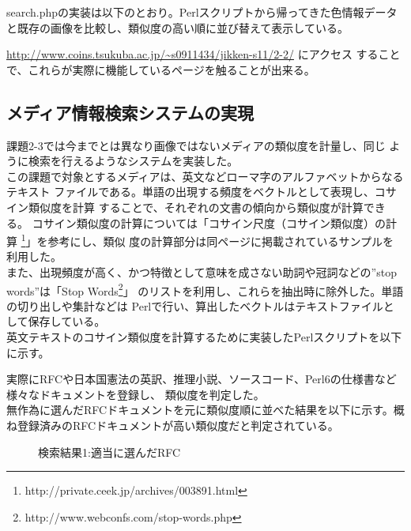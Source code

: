 \documentclass[a4paper,9pt]{jsarticle}
\begin{document}
search.phpの実装は以下のとおり。Perlスクリプトから帰ってきた色情報データ
と既存の画像を比較し、類似度の高い順に並び替えて表示している。



\url{http://www.coins.tsukuba.ac.jp/~s0911434/jikken-s11/2-2/} にアクセス
することで、これらが実際に機能しているページを触ることが出来る。

\subsection{メディア情報検索システムの実現}
課題2-3では今までとは異なり画像ではないメディアの類似度を計量し、同じ
ように検索を行えるようなシステムを実装した。\\

この課題で対象とするメディアは、英文などローマ字のアルファベットからなるテキスト
ファイルである。単語の出現する頻度をベクトルとして表現し、コサイン類似度を計算
することで、それぞれの文書の傾向から類似度が計算できる。
コサイン類似度の計算については「コサイン尺度（コサイン類似度）の計算
\footnote{http://private.ceek.jp/archives/003891.html}」を参考にし、類似
度の計算部分は同ページに掲載されているサンプルを利用した。\\

また、出現頻度が高く、かつ特徴として意味を成さない助詞や冠詞などの''stop
words''は「Stop Words\footnote{http://www.webconfs.com/stop-words.php}」
のリストを利用し、これらを抽出時に除外した。単語の切り出しや集計などは
Perlで行い、算出したベクトルはテキストファイルとして保存している。\\

英文テキストのコサイン類似度を計算するために実装したPerlスクリプトを以下
に示す。



実際にRFCや日本国憲法の英訳、推理小説、ソースコード、Perl6の仕様書など様々なドキュメントを登録し、
類似度を判定した。\\

無作為に選んだRFCドキュメントを元に類似度順に並べた結果を以下に示す。概
ね登録済みのRFCドキュメントが高い類似度だと判定されている。

\begin{figure}[H]
 \caption{検索結果1:適当に選んだRFC}
 \begin{center}
 \end{center}
\end{figure}
\end{document}
